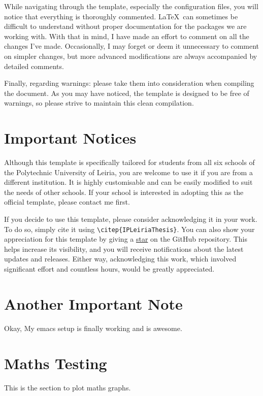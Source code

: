 While navigating through the template, especially the configuration files, you will notice that everything is thoroughly commented. \LaTeX~can sometimes be difficult to understand without proper documentation for the packages we are working with. With that in mind, I have made an effort to comment on all the changes I’ve made. Occasionally, I may forget or deem it unnecessary to comment on simpler changes, but more advanced modifications are always accompanied by detailed comments.

Finally, regarding warnings: please take them into consideration when compiling the document. As you may have noticed, the template is designed to be free of warnings, so please strive to maintain this clean compilation.

\section{Important Notices}
Although this template is specifically tailored for students from all six schools of the Polytechnic University of Leiria, you are welcome to use it if you are from a different institution. It is highly customisable and can be easily modified to suit the needs of other schools. If your school is interested in adopting this as the official template, please contact me first.

If you decide to use this template, please consider acknowledging it in your work. To do so, simply cite it using \verb|\citep{IPLeiriaThesis}|. You can also show your appreciation for this template by giving a \href{https://github.com/joseareia/ipleiria-thesis/stargazers}{star} on the GitHub repository. This helps increase its visibility, and you will receive notifications about the latest updates and releases. Either way, acknowledging this work, which involved significant effort and countless hours, would be greatly appreciated.

\section{Another Important Note}
Okay, My emacs setup is finally working and is awesome.

\section{Maths Testing}
This is the section to plot maths graphs.

\vspace{10pt}

